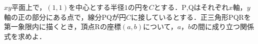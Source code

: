 \documentclass[../../main.tex]{subfiles}
\begin{document}
$xy$平面上で，$(1,1)$を中心とする半径$1$の円を$C$とする．$\mathrm{P}$,$\mathrm{Q}$はそれぞれ$x$軸，$y$軸の正の部分にある点で，線分$\mathrm{PQ}$が円$C$に接しているとする．正三角形$\mathrm{PQR}$を第一象限内に描くとき，頂点$\mathrm{R}$の座標$(a,b)$について，$a$，$b$の間に成り立つ関係式を求めよ．
\end{document}
